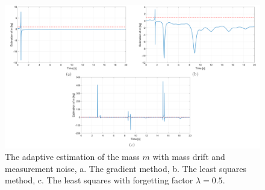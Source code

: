 \documentclass[12pt]{article}
\begin{document}
\begin{figure}[!h]
	\includegraphics[width=.95\columnwidth]{figures/noise_m.png}
	\centering
	\caption{The adaptive estimation of the mass $m$ with mass drift and measurement noise, a. The gradient method, b. The least squares method, c. The least squares with forgetting factor $\lambda=0.5$.}
	\label{fig_noise_m}
\end{figure}
\end{document}
